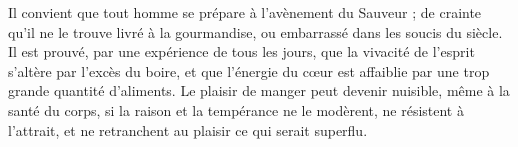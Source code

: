 Il convient que tout homme se prépare à l’avènement du Sauveur ; de crainte qu’il ne le trouve livré à la gourmandise, ou embarrassé dans les soucis du siècle. Il est prouvé, par une expérience de tous les jours, que la vivacité de l’esprit s’altère par l’excès du boire, et que l’énergie du cœur est affaiblie par une trop grande quantité d’aliments. Le plaisir de manger peut devenir nuisible, même à la santé du corps, si la raison et la tempérance ne le modèrent, ne résistent à l’attrait, et ne retranchent au plaisir ce qui serait superflu.